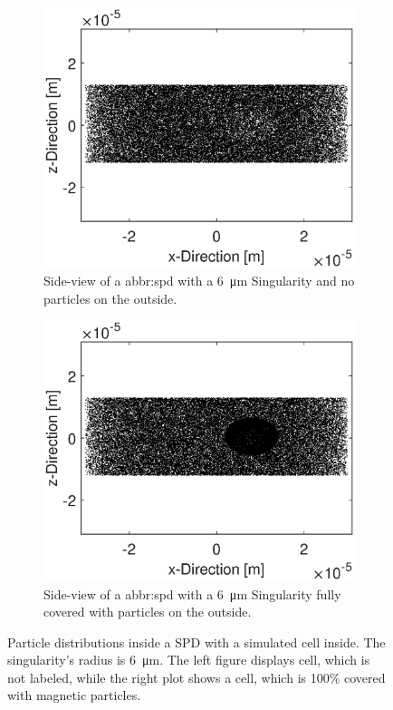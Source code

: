 	\begin{figure}[htb!]
	\begin{subfigure}[l]{0.49\linewidth} 
		\centering
		\includegraphics[clip,trim={0mm 0mm 0mm 0mm}, width=\linewidth]{Ressourcen/Results/Singularity/Side-empty}
		\caption{Side-view of a \acrshort{abbr:spd} with a \SI{6}{\micro\meter} Singularity and no particles on the outside.}
		\label{fig:sim:singularity:drop:empty}
	\end{subfigure}
	\hfil
	\begin{subfigure}[r]{0.49\linewidth} 
		\centering
		\includegraphics[clip,trim={0mm 0mm 0mm 0mm}, width=\linewidth]{Ressourcen/Results/Singularity/Side-full}
		\caption{Side-view of a \acrshort{abbr:spd} with a \SI{6}{\micro\meter} Singularity fully covered with particles on the outside.}
		\label{fig:sim:singularity:drop:full}
	\end{subfigure}
	\caption{Particle distributions inside a SPD with a simulated cell inside. The singularity's radius is \SI{6}{\micro\meter}. The left figure displays cell, which is not labeled, while the right plot shows a cell, which is 100\% covered with magnetic particles.}
	\label{fig:sim:singularity:drop}
\end{figure}

